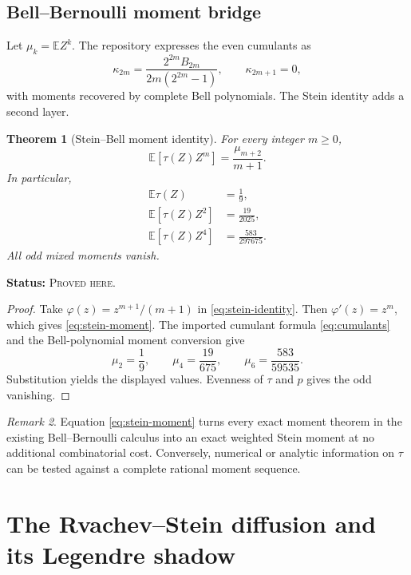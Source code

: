 \documentclass[11pt,oneside]{article}
\newtheorem{theorem}{Theorem}[section]
\theoremstyle{definition}
\theoremstyle{remark}
\newtheorem{remark}[theorem]{Remark}
\newcommand{\E}{\mathbb E}
\newcommand{\ProvedHere}{\textcolor{statusgreen}{\textsc{Proved here}}}
\newcommand{\Status}[1]{\par\smallskip\noindent\textbf{Status:} #1.\par\smallskip}
\begin{document}
\subsection{Bell--Bernoulli moment bridge}
Let $\mu_k=\E Z^k$.  The repository expresses the even cumulants as
\begin{equation}\label{eq:cumulants}
 \kappa_{2m}=\frac{2^{2m}B_{2m}}{2m(2^{2m}-1)},
 \qquad \kappa_{2m+1}=0,
\end{equation}
with moments recovered by complete Bell polynomials.  The Stein identity adds a
second layer.

\begin{theorem}[Stein--Bell moment identity]\label{thm:stein-bell}
For every integer $m\ge0$,
\begin{equation}\label{eq:stein-moment}
 \E[\tau(Z)Z^m]=\frac{\mu_{m+2}}{m+1}.
\end{equation}
In particular,
\begin{align}
 \E\tau(Z)&=\frac19,\label{eq:Etau}\\
 \E[\tau(Z)Z^2]&=\frac{19}{2025},\label{eq:EtauZ2}\\
 \E[\tau(Z)Z^4]&=\frac{583}{297675}.
 \label{eq:EtauZ4}
\end{align}
All odd mixed moments vanish.
\end{theorem}
\Status{\ProvedHere}

\begin{proof}
Take $\varphi(z)=z^{m+1}/(m+1)$ in \eqref{eq:stein-identity}.  Then
$\varphi'(z)=z^m$, which gives \eqref{eq:stein-moment}.  The imported cumulant
formula \eqref{eq:cumulants} and the Bell-polynomial moment conversion give
\[
 \mu_2=\frac19,
 \qquad \mu_4=\frac{19}{675},
 \qquad \mu_6=\frac{583}{59535}.
\]
Substitution yields the displayed values.  Evenness of $\tau$ and $p$ gives the
odd vanishing.
\end{proof}

\begin{remark}
Equation \eqref{eq:stein-moment} turns every exact moment theorem in the existing
Bell--Bernoulli calculus into an exact weighted Stein moment at no additional
combinatorial cost.  Conversely, numerical or analytic information on $\tau$ can
be tested against a complete rational moment sequence.
\end{remark}

\section{The Rvachev--Stein diffusion and its Legendre shadow}
\end{document}
